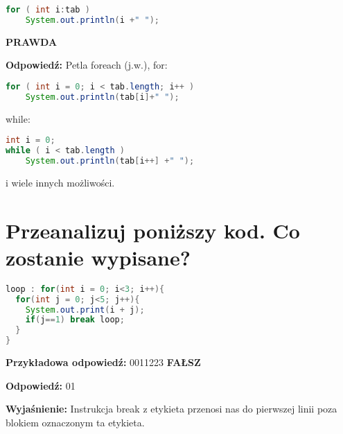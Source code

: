 \begin{lstlisting}[language=java]
for ( int i:tab )
	System.out.println(i +" ");
\end{lstlisting}

\textbf{PRAWDA}

\vspace{0.4cm}
\noindent
\textbf{Odpowiedź:}
Petla foreach (j.w.), for:
\begin{lstlisting}[language=java]
for ( int i = 0; i < tab.length; i++ )
	System.out.println(tab[i]+" ");
\end{lstlisting}
while:
\begin{lstlisting}[language=java]
int i = 0;
while ( i < tab.length )
	System.out.println(tab[i++] +" ");
\end{lstlisting}
i wiele innych możliwości.
\vspace{0.4cm}
\noindent


\section{Przeanalizuj poniższy kod. Co zostanie wypisane?}
\begin{lstlisting}[language=java]
loop : for(int i = 0; i<3; i++){
  for(int j = 0; j<5; j++){
    System.out.print(i + j);
    if(j==1) break loop;
  }
}
\end{lstlisting}

\noindent
\textbf{Przykładowa odpowiedź:} 0011223
\textbf{FAŁSZ}

\vspace{0.4cm}
\noindent
\textbf{Odpowiedź:} 01

\vspace{0.4cm}
\noindent
\textbf{Wyjaśnienie:} Instrukcja break z etykieta przenosi nas do pierwszej linii poza blokiem oznaczonym ta etykieta.

